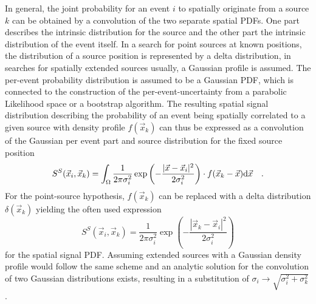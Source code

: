 In general, the joint probability for an event $i$ to spatially originate from a source $k$ can be obtained by a convolution of the two separate spatial PDFs.
One part describes the intrinsic distribution for the source and the other part the intrinsic distribution of the event itself.
In a search for point sources at known positions, the distribution of a source position is represented by a delta distribution, in searches for spatially extended sources usually, a Gaussian profile is assumed.
The per-event probability distribution is assumed to be a Gaussian PDF, which is connected to the construction of the per-event-uncertainty from a parabolic Likelihood space or a bootstrap algorithm.
The resulting spatial signal distribution describing the probability of an event being spatially correlated to a given source with density profile $f(\vec{x}_k)$ can thus be expressed as a convolution of the Gaussian per event part and source distribution for the fixed source position
\begin{equation}
  \label{equ:spatial_pdf}
  S^S(\vec{x}_i, \vec{x}_k)
  = \int_\Omega \frac{1}{2\pi \sigma_i^2}
    \exp\left(-\frac{|\vec{x}-\vec{x}_i|^2}{2\sigma_i^2}\right) \cdot
    f(\vec{x}_k - \vec{x}) \mathrm{d}\vec{x} \\
    \quad\text{.}
\end{equation}
For the point-source hypothesis, $f(\vec{x}_k)$ can be replaced with a delta distribution $\delta(\vec{x}_k)$ yielding the often used expression
\begin{equation}
  S^S(\vec{x}_i, \vec{x}_k)
  = \frac{1}{2\pi \sigma_i^2}
    \exp\left(-\frac{|\vec{x}_k-\vec{x}_i|^2}
                    {2\sigma_i^2}\right)
\end{equation}
for the spatial signal PDF.
Assuming extended sources with a Gaussian density profile would follow the same scheme and an analytic solution for the convolution of two Gaussian distributions exists, resulting in a substitution of $\sigma_i \rightarrow \sqrt{\sigma_i^2 + \sigma_k^2}$ .

